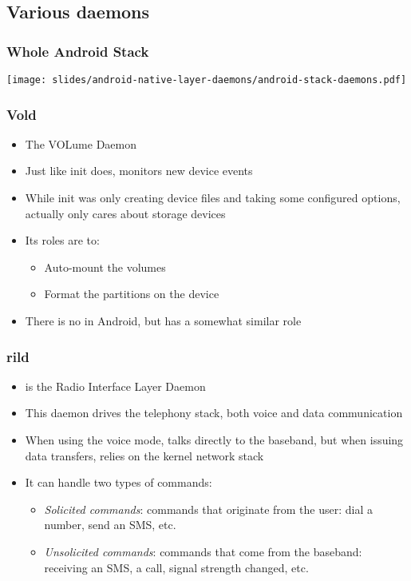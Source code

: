 \subsection{Various daemons}

\begin{frame}
  \frametitle{Whole Android Stack}
  \begin{center}
    \texttt{[image: slides/android-native-layer-daemons/android-stack-daemons.pdf]}
  \end{center}
\end{frame}

\begin{frame}
  \frametitle{Vold}
  \begin{itemize}
  \item The VOLume Daemon
  \item Just like init does, monitors new device events
  \item While init was only creating device files and taking some
    configured options,  actually only cares about storage
    devices
  \item Its roles are to:
    \begin{itemize}
    \item Auto-mount the volumes
    \item Format the partitions on the device
    \end{itemize}
  \item There is no  in Android, but
     has a somewhat similar role
  \end{itemize}
\end{frame}

\begin{frame}
  \frametitle{rild}
  \begin{itemize}
  \item {} is the Radio Interface Layer Daemon
  \item This daemon drives the telephony stack, both voice and data
    communication
  \item When using the voice mode, talks directly to the baseband, but
    when issuing data transfers, relies on the kernel network stack
  \item It can handle two types of commands:
    \begin{itemize}
    \item \textit{Solicited commands}: commands that originate from
      the user: dial a number, send an SMS, etc.
    \item \textit{Unsolicited commands}: commands that come from the
      baseband: receiving an SMS, a call, signal strength changed, etc.
    \end{itemize}
  \end{itemize}
\end{frame}

